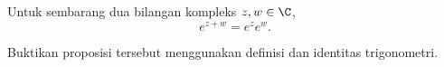 
\begin{prop}
Untuk sembarang dua bilangan kompleks $z,w \in \C$,
\begin{equation*}
e^{z+w} = e^z e^w .
\end{equation*}
\end{prop}

\begin{exbox}
\begin{exercise}%
Buktikan proposisi tersebut menggunakan definisi dan identitas trigonometri.
\end{exercise}
\end{exbox}
